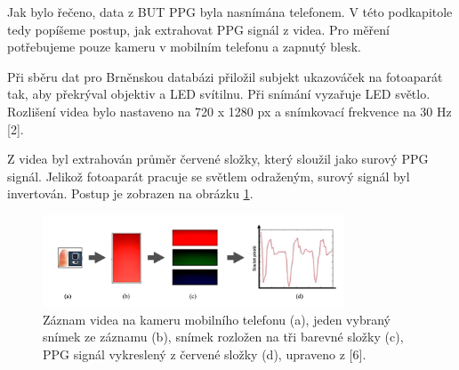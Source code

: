 Jak bylo řečeno, data z BUT PPG byla nasnímána telefonem.
V této podkapitole tedy popíšeme postup, jak extrahovat PPG signál z videa.
Pro měření potřebujeme pouze kameru v mobilním telefonu a zapnutý blesk. 

Při sběru dat pro Brněnskou databázi přiložil subjekt ukazováček na fotoaparát tak, aby překrýval objektiv a LED svítilnu.
Při snímání vyzařuje LED světlo. Rozlišení videa bylo nastaveno na 720 x 1280 px a snímkovací frekvence na 30 Hz [2]. 

Z videa byl extrahován průměr červené složky, který sloužil jako surový PPG signál.
Jelikož fotoaparát pracuje se světlem odraženým, surový signál byl invertován.
Postup je zobrazen na obrázku \ref{fig:videoZaznamPPG}.

\begin{figure}[h]
	\centering
	\includegraphics[width=0.8\textwidth]{./obrazky/videoZaznamPPG.png}
	\caption{Záznam videa na kameru mobilního telefonu (a), jeden vybraný snímek ze záznamu (b), snímek rozložen na tři barevné složky (c), PPG signál vykreslený z červené složky (d), upraveno z [6].}
	\label{fig:videoZaznamPPG}
\end{figure}
